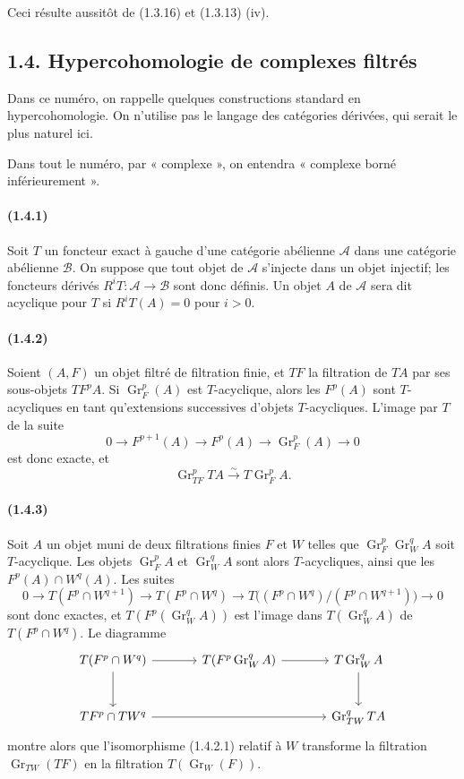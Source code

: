 \documentclass[10pt]{article}
\newcommand{\Gr}{\operatorname{Gr}}
\newcommand{\calA}{\mathcal A}
\newcommand{\calB}{\mathcal B}
\newcommand{\iso}{\xrightarrow{\sim}}
\begin{document}
Ceci résulte aussitôt de (1.3.16) et (1.3.13) (iv).

\subsection*{1.4. Hypercohomologie de complexes filtrés}

Dans ce numéro, on rappelle quelques constructions standard en hypercohomologie. On n'utilise pas le langage des catégories dérivées, qui serait le plus naturel ici.

Dans tout le numéro, par « complexe », on entendra « complexe borné inférieurement ».

\paragraph{(1.4.1)} Soit $T$ un foncteur exact à gauche d'une catégorie abélienne $\calA$ dans une catégorie abélienne $\calB$. On suppose que tout objet de $\calA$ s'injecte dans un objet injectif; les foncteurs dérivés $R^iT:\calA\to\calB$ sont donc définis. Un objet $A$ de $\calA$ sera dit acyclique pour $T$ si $R^iT(A)=0$ pour $i>0$.

\paragraph{(1.4.2)} Soient $(A,F)$ un objet filtré de filtration finie, et $TF$ la filtration de $TA$ par ses sous-objets $TF^pA$. Si $\Gr_F^p(A)$ est $T$-acyclique, alors les $F^p(A)$ sont $T$-acycliques en tant qu'extensions successives d'objets $T$-acycliques. L'image par $T$ de la suite
\[
0\to F^{p+1}(A)\to F^p(A)\to\Gr_F^p(A)\to0
\]
est donc exacte, et
\[
\tag{1.4.2.1}
\Gr_{TF}^pTA\iso T\Gr_F^pA.
\]

\paragraph{(1.4.3)} Soit $A$ un objet muni de deux filtrations finies $F$ et $W$ telles que $\Gr_F^p\Gr_W^qA$ soit $T$-acyclique. Les objets $\Gr_F^pA$ et $\Gr_W^qA$ sont alors $T$-acycliques, ainsi que les $F^p(A)\cap W^q(A)$. Les suites
\[
0\to T(F^p\cap W^{q+1})\to T(F^p\cap W^q)\to T\bigl((F^p\cap W^q)/(F^p\cap W^{q+1})\bigr)\to0
\]
sont donc exactes, et $T(F^p(\Gr_W^qA))$ est l'image dans $T(\Gr_W^qA)$ de $T(F^p\cap W^q)$. Le diagramme
\[
\begin{tikzcd}[column sep=large,row sep=large]
T(F^p\cap W^q) \arrow[r] \arrow[d] & T(F^p\Gr_W^qA) \arrow[r] & T\Gr_W^qA \arrow[d]\\
TF^p\cap TW^q \arrow[rr] && \Gr_{TW}^qTA
\end{tikzcd}
\]
montre alors que l'isomorphisme (1.4.2.1) relatif à $W$ transforme la filtration $\Gr_{TW}(TF)$ en la filtration $T(\Gr_W(F))$.
\end{document}
